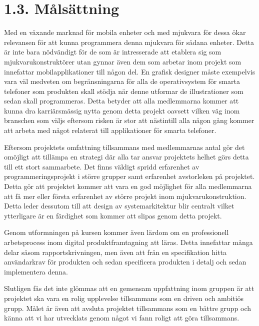 \section{1.3. Målsättning}
Med en växande marknad för mobila enheter och med mjukvara för dessa ökar relevansen för att kunna programmera denna mjukvara för sådana enheter. Detta är inte bara nödvändigt för de som är intresserade att etablera sig som mjukvarukonstruktörer utan gynnar även dem som arbetar inom projekt som innefattar mobilapplikationer till någon del. En grafisk designer måste exempelvis vara väl medveten om begränsningarna för alla de operativsystem för smarta telefoner som produkten skall stödja när denne utformar de illustrationer som sedan skall programmeras. Detta betyder att alla medlemmarna kommer att kunna dra karriärsmässig nytta genom detta projekt oavsett vilken väg inom branschen som väljs eftersom risken är stor att nästintill alla någon gång kommer att arbeta med något relaterat till applikationer för smarta telefoner.

Eftersom projektets omfattning tillsammans med medlemmarnas antal gör det omöjligt att tillämpa en strategi där alla tar ansvar projektets helhet görs detta till ett stort sammarbete. Det finns väldigt spridd erfarenhet av programmeringsprojekt i större grupper samt erfarenhet avstorleken på projektet. Detta gör att projektet kommer att vara en god möjlighet för alla medlemmarna att få mer eller första erfarenhet av större projekt inom mjukvarukonstruktion. Detta leder dessutom till att design av systemarkitektur blir centralt vilket ytterligare är en färdighet som kommer att slipas genom detta projekt.

Genom utformningen på kursen kommer även lärdom om en professionell arbetsprocess inom digital produktframtagning att läras. Detta innefattar många delar såsom rapportskrivningen, men även att från en specifikation hitta användarkrav för produkten och sedan specificera produkten i detalj och sedan implementera denna.

Slutligen fås det inte glömmas att en gemensam uppfattning inom gruppen är att projektet ska vara en rolig upplevelse tillsammans som en driven och ambitiös grupp. Målet är även att avsluta projektet tillsammans som en bättre grupp och känna att vi har utvecklats genom något vi fann roligt att göra tillsammans. 
